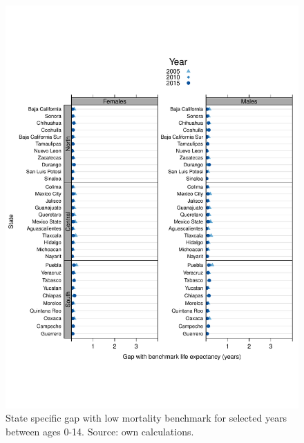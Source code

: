 \documentclass[11.5pt]{article}
\begin{document}
{\begin{figure}
\centering
\caption{State specific gap with low mortality benchmark for selected years between ages 0-14. Source: own calculations.}
\begin{center}
\includegraphics[scale=.8]{Figures/Distance_y.pdf}
\end{center}
\end{figure}

}
\end{document}
